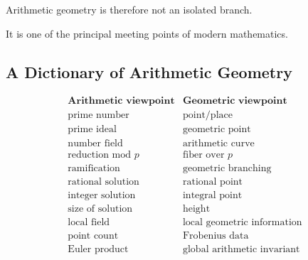 \begin{centereddiagram}
\end{centereddiagram}

Arithmetic geometry is therefore not an isolated branch.

It is one of the principal meeting points of modern mathematics.

\subsection{A Dictionary of Arithmetic Geometry}
\label{subsec:arithmetic-geometry-dictionary}

\[
\begin{array}{c|c}
\textbf{Arithmetic viewpoint} & \textbf{Geometric viewpoint}\\
\hline
\text{prime number} & \text{point/place}\\
\text{prime ideal} & \text{geometric point}\\
\text{number field} & \text{arithmetic curve}\\
\text{reduction mod }p & \text{fiber over }p\\
\text{ramification} & \text{geometric branching}\\
\text{rational solution} & \text{rational point}\\
\text{integer solution} & \text{integral point}\\
\text{size of solution} & \text{height}\\
\text{local field} & \text{local geometric information}\\
\text{point count} & \text{Frobenius data}\\
\text{Euler product} & \text{global arithmetic invariant}
\end{array}
\]


